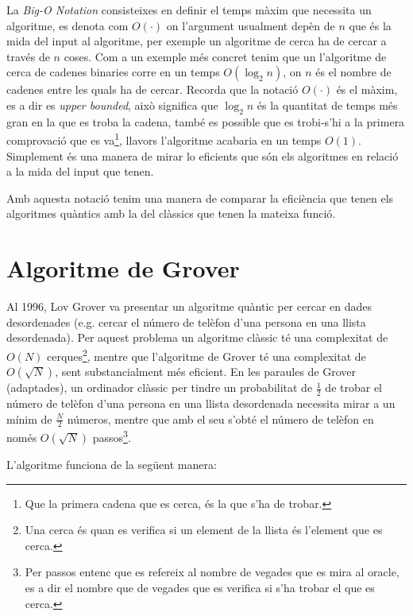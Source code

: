 La \textit{Big-O Notation} consisteixes en definir el temps màxim que necessita un algoritme, es denota com $O(\cdot)$ on l'argument usualment depèn de $n$ que és la mida del input al algoritme, per exemple un algoritme de cerca ha de cercar a través de $n$ coses. Com a un exemple més concret tenim que un l'algoritme de cerca de cadenes binaries corre en un temps $O(\log_{2} n)$, on $n$ és el nombre de cadenes entre les quals ha de cercar. Recorda que la notació $O(\cdot)$ és el màxim, es a dir es \textit{upper bounded}, això significa que $\log_{2} n$ és la quantitat de temps més gran en la que es troba la cadena, també es possible que es trobi-s'hi a la primera comprovació que es va\footnote{Que la primera cadena que es cerca, és la que s'ha de trobar.}, llavors l'algoritme acabaria en un temps $O(1)$. Simplement és una manera de mirar lo eficients que són els algoritmes en relació a la mida del input que tenen.

Amb aquesta notació tenim una manera de comparar la eficiència que tenen els algoritmes quàntics amb la del clàssics que tenen la mateixa funció. 

\section{Algoritme de Grover}
Al 1996, Lov Grover va presentar un algoritme quàntic per cercar en dades desordenades \cite{Grover_96} (e.g. cercar el número de telèfon d'una persona en una llista desordenada). Per aquest problema un algoritme clàssic té una complexitat de $O(N)$ cerques\footnote{Una cerca és quan es verifica si un element de la llista és l'element que es cerca.}, mentre que l'algoritme de Grover té una complexitat de $O(\sqrt{N})$, sent substancialment més eficient. En les paraules de Grover \cite{Grover_96} (adaptades), un ordinador clàssic per tindre un probabilitat de $\frac{1}{2}$ de trobar el número de telèfon d'una persona en una llista desordenada necessita mirar a un mínim de $\frac{N}{2}$ números, mentre que amb el seu s'obté el número de telèfon en només $O(\sqrt{N})$ passos\footnote{Per passos entenc que es refereix al nombre de vegades que es mira al oracle, es a dir el nombre que de vegades que es verifica si s'ha trobar el que es cerca.}.

L'algoritme funciona de la següent manera: 


